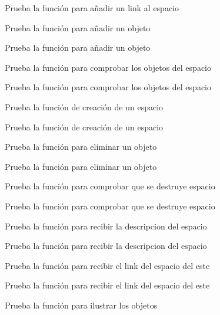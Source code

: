\begin{DoxyRefList}
Prueba la función para añadir un link al espacio  
\item[\label{test__test000063}%
\Hypertarget{test__test000063}%
Member \hyperlink{space__test_8c_af5de291847d272d79a524c30b96f6f0c}{test2\+\_\+space\+\_\+add\+\_\+object} ()]Prueba la función para añadir un objeto 

Prueba la función para añadir un objeto  
\item[\label{test__test000079}%
\Hypertarget{test__test000079}%
Member \hyperlink{space__test_8c_a38e4abfa3cee772d0c0ecedb73ee98c1}{test2\+\_\+space\+\_\+check\+\_\+object} ()]Prueba la función para comprobar los objetos del espacio 

Prueba la función para comprobar los objetos del espacio  
\item[\label{test__test000027}%
\Hypertarget{test__test000027}%
Member \hyperlink{space__test_8c_a012cd3cf37a8d91e2d7098a264c29d65}{test2\+\_\+space\+\_\+create} ()]Prueba la función de creación de un espacio 

Prueba la función de creación de un espacio  
\item[\label{test__test000066}%
\Hypertarget{test__test000066}%
Member \hyperlink{space__test_8c_a842b5c58aac24bd88042ca1244ca65d0}{test2\+\_\+space\+\_\+delete\+\_\+object} ()]Prueba la función para eliminar un objeto 

Prueba la función para eliminar un objeto  
\item[\label{test__test000083}%
\Hypertarget{test__test000083}%
Member \hyperlink{space__test_8c_ad8a5df09bd9f731be1ce6048e92e58c4}{test2\+\_\+space\+\_\+destroy} ()]Prueba la función para comprobar que se destruye espacio 

Prueba la función para comprobar que se destruye espacio  
\item[\label{test__test000061}%
\Hypertarget{test__test000061}%
Member \hyperlink{space__test_8c_aebfa57e927e8f871e73425975c11976b}{test2\+\_\+space\+\_\+get\+\_\+description} ()]Prueba la función para recibir la descripcion del espacio 

Prueba la función para recibir la descripcion del espacio  
\item[\label{test__test000052}%
\Hypertarget{test__test000052}%
Member \hyperlink{space__test_8c_a249293510e61c6d5465f52c14343d02b}{test2\+\_\+space\+\_\+get\+\_\+east} ()]Prueba la función para recibir el link del espacio del este 

Prueba la función para recibir el link del espacio del este  
\item[\label{test__test000076}%
\Hypertarget{test__test000076}%
Member \hyperlink{space__test_8c_a2493b75912abcf809c5b596389eda765}{test2\+\_\+space\+\_\+get\+\_\+gdesc\+\_\+illustration} ()]Prueba la función para ilustrar los objetos 


\end{DoxyRefList}
